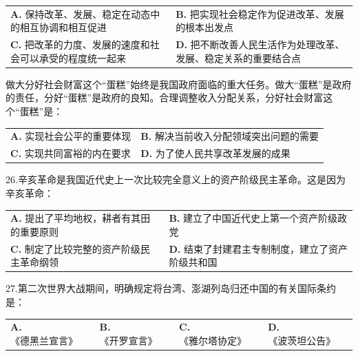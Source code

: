 \documentclass[UTF8,11pt]{ctexart}
\begin{document}
\begin{center}\begin{tabular}{>{\raggedright\arraybackslash}p{\dimexpr(\linewidth-4\tabcolsep)/2\relax}>{\raggedright\arraybackslash}p{\dimexpr(\linewidth-4\tabcolsep)/2\relax}}
\textbf{A.} 保持改革、发展、稳定在动态中的相互协调和相互促进 & \textbf{B.} 把实现社会稳定作为促进改革、发展的根本出发点\\[.35em]
\textbf{C.} 把改革的力度、发展的速度和社会可以承受的程度统一起来 & \textbf{D.} 把不断改善人民生活作为处理改革、发展、稳定关系的重要结合点\\[.35em]\end{tabular}\end{center}

做大分好社会财富这个“蛋糕”始终是我国政府面临的重大任务。做大“蛋糕”是政府的责任，分好“蛋糕”是政府的良知。合理调整收入分配关系，分好社会财富这个“蛋糕”是：


\begin{center}\begin{tabular}{>{\raggedright\arraybackslash}p{\dimexpr(\linewidth-4\tabcolsep)/2\relax}>{\raggedright\arraybackslash}p{\dimexpr(\linewidth-4\tabcolsep)/2\relax}}
\textbf{A.} 实现社会公平的重要体现 & \textbf{B.} 解决当前收入分配领域突出问题的需要\\[.35em]
\textbf{C.} 实现共同富裕的内在要求 & \textbf{D.} 为了使人民共享改革发展的成果\\[.35em]\end{tabular}\end{center}

26.辛亥革命是我国近代史上一次比较完全意义上的资产阶级民主革命。这是因为辛亥革命：


\begin{center}\begin{tabular}{>{\raggedright\arraybackslash}p{\dimexpr(\linewidth-4\tabcolsep)/2\relax}>{\raggedright\arraybackslash}p{\dimexpr(\linewidth-4\tabcolsep)/2\relax}}
\textbf{A.} 提出了平均地权，耕者有其田的重要原则 & \textbf{B.} 建立了中国近代史上第一个资产阶级政党\\[.35em]
\textbf{C.} 制定了比较完整的资产阶级民主革命纲领 & \textbf{D.} 结束了封建君主专制制度，建立了资产阶级共和国\\[.35em]\end{tabular}\end{center}

27.第二次世界大战期间，明确规定将台湾、澎湖列岛归还中国的有关国际条约是：


\begin{center}\begin{tabular}{>{\raggedright\arraybackslash}p{\dimexpr(\linewidth-8\tabcolsep)/4\relax}>{\raggedright\arraybackslash}p{\dimexpr(\linewidth-8\tabcolsep)/4\relax}>{\raggedright\arraybackslash}p{\dimexpr(\linewidth-8\tabcolsep)/4\relax}>{\raggedright\arraybackslash}p{\dimexpr(\linewidth-8\tabcolsep)/4\relax}}
\textbf{A.} 《德黑兰宣言》 & \textbf{B.} 《开罗宣言》 & \textbf{C.} 《雅尔塔协定》 & \textbf{D.} 《波茨坦公告》\\[.35em]\end{tabular}\end{center}
\end{document}
